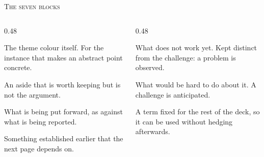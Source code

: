 \documentclass[xcolor=dvipsnames, aspectratio=1610]{beamer}
\begin{document}
\begin{frame}{\textsc{The seven blocks}}

  \begin{columns}[T]
    \begin{column}{0.48\linewidth}
      \begin{ExampleBox}
        \scriptsize The theme colour itself. For the instance that makes an
        abstract point concrete.
      \end{ExampleBox}
      \begin{CommentBox}
        \scriptsize An aside that is worth keeping but is not the argument.
      \end{CommentBox}
      \begin{ProposalBox}
        \scriptsize What is being put forward, as against what is being
        reported.
      \end{ProposalBox}
      \begin{ReminderBox}
        \scriptsize Something established earlier that the next page depends
        on.
      \end{ReminderBox}
    \end{column}
    \begin{column}{0.48\linewidth}
      \begin{ProblemBox}
        \scriptsize What does not work yet. Kept distinct from the challenge:
        a problem is observed.
      \end{ProblemBox}
      \begin{ChallengeBox}
        \scriptsize What would be hard to do about it. A challenge is
        anticipated.
      \end{ChallengeBox}
      \begin{DefinitionBox}
        \scriptsize A term fixed for the rest of the deck, so it can be used
        without hedging afterwards.
      \end{DefinitionBox}
    \end{column}
  \end{columns}

\end{frame}
\end{document}
